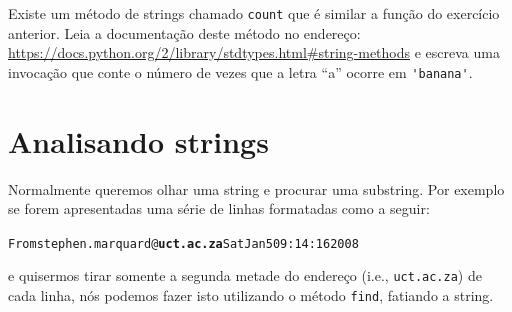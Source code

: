 {\begin{ex}


Existe um método de strings chamado {\tt count} que é similar a função do
exercício anterior. Leia a documentação deste método no endereço:
\url{https://docs.python.org/2/library/stdtypes.html#string-methods}
e escreva uma invocação que conte o número de vezes que a letra ``a'' ocorre
em \verb"'banana'".
\end{ex}

\section{Analisando strings}


Normalmente queremos olhar uma string e procurar uma substring. Por exemplo
se forem apresentadas uma série de linhas formatadas como a seguir:

\beforeverb
\begin{alltt}
From stephen.marquard@{\bf uct.ac.za} Sat Jan  5 09:14:16 2008
\end{alltt}
\afterverb


e quisermos tirar somente a segunda metade do endereço (i.e., {\tt uct.ac.za})
de cada linha, nós podemos fazer isto utilizando o método {\tt find}, fatiando
a string.


}
